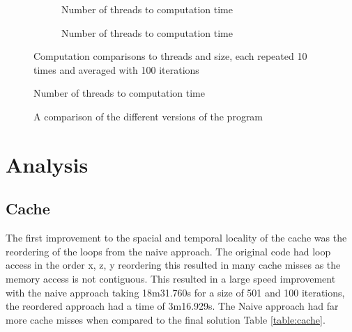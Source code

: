 \documentclass[12pt]{article}
\begin{document}
\begin{figure}
\end{figure}
\begin{figure}
    \centering
    \begin{subfigure}[b]{0.45\textwidth}
        \begin{adjustbox}{width=\textwidth}
        
        \end{adjustbox}
        \caption{Number of threads to computation time}
        \label{fig:st}
    \end{subfigure}
    \begin{subfigure}[b]{0.45\textwidth}
        \begin{adjustbox}{width=\textwidth}
        
        \end{adjustbox}
        \caption{Number of threads to computation time}
        \label{fig:tt}
    \end{subfigure}
    \caption{Computation comparisons to threads and size, each repeated 10 times and averaged with 100 iterations}
    \label{fig:speed}
\end{figure}


\begin{figure}[H]
    \centering
    
    \caption{Number of threads to computation time}
\end{figure}

\begin{figure}
    \centering
    \begin{adjustbox}{width=0.6\textwidth}
    
    \end{adjustbox}
    \caption{A comparison of the different versions of the program}
    \label{fig:comp}
\end{figure}


\section{Analysis}

\subsection{Cache}
The first improvement to the spacial and temporal locality of the cache was the reordering of the loops from the naive approach.
The original code had loop access in the order x, z, y reordering this resulted in many cache misses as the memory access is not contiguous.
This resulted in a large speed improvement with the naive approach taking 18m31.760s for a size of 501 and 100 iterations, the reordered approach
had a time of 3m16.929s. The Naive approach had far more cache misses when compared to the final solution Table \ref{table:cache}.
\end{document}
